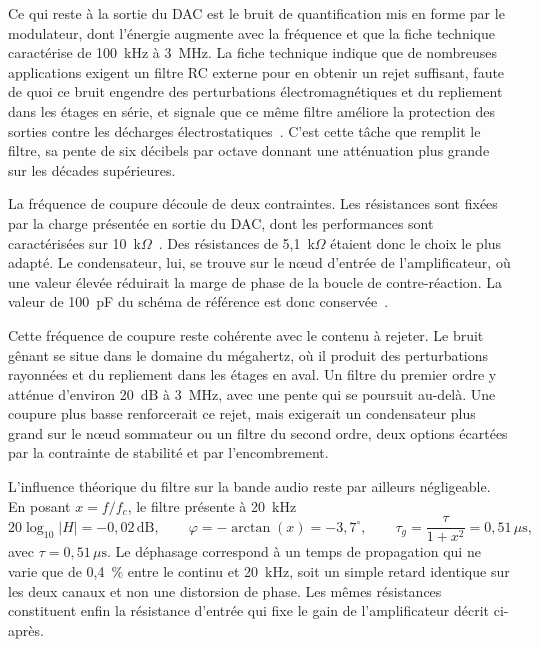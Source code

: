 Ce qui reste à la sortie du DAC est le bruit de quantification mis en forme par le modulateur, dont l'énergie augmente avec la fréquence et que la fiche technique caractérise de 100~kHz à 3~MHz. La fiche technique indique que de nombreuses applications exigent un filtre RC externe pour en obtenir un rejet suffisant, faute de quoi ce bruit engendre des perturbations électromagnétiques et du repliement dans les étages en série, et signale que ce même filtre améliore la protection des sorties contre les décharges électrostatiques~\cite{TI_PCM5242}. C'est cette tâche que remplit le filtre, sa pente de six décibels par octave donnant une atténuation plus grande sur les décades supérieures.

La fréquence de coupure découle de deux contraintes. Les résistances sont fixées par la charge présentée en sortie du DAC, dont les performances sont caractérisées sur 10~k$\Omega$~\cite{TI_PCM5242}. Des résistances de 5,1~k$\Omega$ étaient donc le choix le plus adapté. Le condensateur, lui, se trouve sur le nœud d'entrée de l'amplificateur, où une valeur élevée réduirait la marge de phase de la boucle de contre-réaction. La valeur de 100~pF du schéma de référence est donc conservée~\cite{TI_PCM5242}.

Cette fréquence de coupure reste cohérente avec le contenu à rejeter. Le bruit gênant se situe dans le domaine du mégahertz, où il produit des perturbations rayonnées et du repliement dans les étages en aval. Un filtre du premier ordre y atténue d'environ 20~dB à 3~MHz, avec une pente qui se poursuit au-delà. Une coupure plus basse renforcerait ce rejet, mais exigerait un condensateur plus grand sur le nœud sommateur ou un filtre du second ordre, deux options écartées par la contrainte de stabilité et par l'encombrement.

L'influence théorique du filtre sur la bande audio reste par ailleurs négligeable. En posant $x = f/f_c$, le filtre présente à 20~kHz
\begin{equation}
  20\log_{10}|H| = -0{,}02\,\text{dB}, \qquad \varphi = -\arctan(x) = -3{,}7^\circ, \qquad \tau_g = \frac{\tau}{1+x^2} = 0{,}51\,\mu\text{s},
\end{equation}
avec $\tau = 0{,}51\,\mu\text{s}$. Le déphasage correspond à un temps de propagation qui ne varie que de 0,4~\% entre le continu et 20~kHz, soit un simple retard identique sur les deux canaux et non une distorsion de phase. Les mêmes résistances constituent enfin la résistance d'entrée qui fixe le gain de l'amplificateur décrit ci-après.


